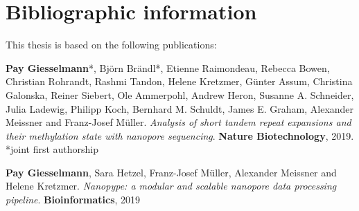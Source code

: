 \chapter*{Bibliographic information}
\label{sec:bib}
\vspace*{-10mm}


This thesis is based on the following publications:


\textbf{Pay Giesselmann}*, Björn Brändl*, Etienne Raimondeau, Rebecca Bowen, Christian Rohrandt, Rashmi Tandon, Helene Kretzmer, Günter Assum, Christina Galonska, Reiner Siebert, Ole Ammerpohl, Andrew Heron, Susanne A. Schneider, Julia Ladewig, Philipp Koch, Bernhard M. Schuldt, James E. Graham, Alexander Meissner and Franz-Josef Müller. \textit{Analysis of short tandem repeat expansions and their methylation state with nanopore sequencing}. \textbf{Nature Biotechnology}, 2019. *joint first authorship



\textbf{Pay Giesselmann}, Sara Hetzel, Franz-Josef Müller, Alexander Meissner and Helene Kretzmer. \textit{Nanopype: a modular and scalable nanopore data processing pipeline}. \textbf{Bioinformatics}, 2019


